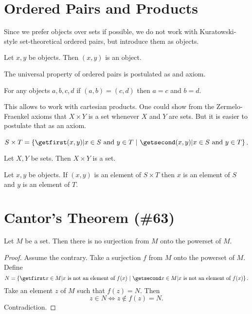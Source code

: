 \documentclass{article}
\begin{document}
\section{Ordered Pairs and Products}

Since we prefer objects over sets if possible, we do not work
with Kuratowski-style set-theoretical ordered pairs, but
introduce them as objects. 
\begin{forthel}
  \begin{lemma}
    Let $x, y$ be objects.
    Then $(x,y)$ is an object.
  \end{lemma}
\end{forthel}
%
The universal property of ordered pairs is postulated as
and axiom.
%
\begin{forthel}
  \begin{axiom}
    For any objects $a, b, c, d$ if $(a,b) = (c,d)$ then $a = c$ and $b = d$.
  \end{axiom}
\end{forthel}
This allows to work with cartesian products. One could show
from the Zermelo-Fraenkel axioms that $X \times Y$ is a set
whenever $X$ and $Y$ are sets. But it is easier to postulate
that as an axiom.
% 
\begin{forthel}
  \begin{definition}
    $S \times T = \class{(x,y) | \text{$x \in S$ and $y \in T$}}$.
  \end{definition}

  \begin{axiom}
    Let $X, Y$ be sets.
    Then $X \times Y$ is a set.
  \end{axiom}

  \begin{lemma}
    Let $x, y$ be objects.
    If $(x,y)$ is an element of $S \times T$ then $x$ is an element of $S$ and
    $y$ is an element of $T$.
  \end{lemma}

\end{forthel}



\section{Cantor's Theorem (\#63)}


\begin{forthel}
    \begin{theorem*}[Cantor]
      Let $M$ be a set. Then there is 
      no surjection from $M$ onto the powerset of $M$.
    \end{theorem*}
    \begin{proof}
      Assume the contrary.
      Take a surjection $f$ from $M$ onto the powerset of $M$.
      Define \[ N = \class{x \in M | \text{$x$ is not an element of $f(x)$}}. \]
      Take an element $z$ of $M$ such that $f(z) = N$.
      Then \[ z \in N \iff z \notin f(z) = N. \]
      Contradiction.
    \end{proof}
\end{forthel}
\end{document}
